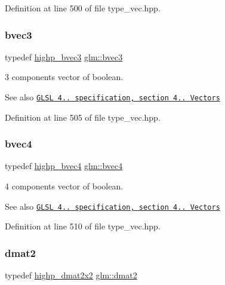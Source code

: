 Definition at line 500 of file type\+\_\+vec.\+hpp.

\mbox{\label{group__core__types_ga3f07d6d37fc6fe875170fd5799685bcf}} 
\subsubsection{\texorpdfstring{bvec3}{bvec3}}
{\footnotesize\ttfamily typedef \hyperlink{group__core__precision_ga1d77a773fdd024602413670788c10c62}{highp\+\_\+bvec3} \hyperlink{group__core__types_ga3f07d6d37fc6fe875170fd5799685bcf}{glm\+::bvec3}}

3 components vector of boolean.

\begin{DoxySeeAlso}{See also}
\href{http://www.opengl.org/registry/doc/GLSLangSpec.4.20.8.pdf}{\tt G\+L\+SL 4.. specification, section 4.. Vectors} 
\end{DoxySeeAlso}


Definition at line 505 of file type\+\_\+vec.\+hpp.

\mbox{\label{group__core__types_ga6bb211b3d3bebae3867548d5673ca5cd}} 
\subsubsection{\texorpdfstring{bvec4}{bvec4}}
{\footnotesize\ttfamily typedef \hyperlink{group__core__precision_ga381539af52c5e5c659700e12fb706eaf}{highp\+\_\+bvec4} \hyperlink{group__core__types_ga6bb211b3d3bebae3867548d5673ca5cd}{glm\+::bvec4}}

4 components vector of boolean.

\begin{DoxySeeAlso}{See also}
\href{http://www.opengl.org/registry/doc/GLSLangSpec.4.20.8.pdf}{\tt G\+L\+SL 4.. specification, section 4.. Vectors} 
\end{DoxySeeAlso}


Definition at line 510 of file type\+\_\+vec.\+hpp.

\mbox{\label{group__core__types_gad8c130d26c4cd9a1a831c1a74292a8f6}} 
\subsubsection{\texorpdfstring{dmat2}{dmat2}}
{\footnotesize\ttfamily typedef \hyperlink{group__core__precision_gaa5e35f6570d394c1cd34f411a473220c}{highp\+\_\+dmat2x2} \hyperlink{group__core__types_gad8c130d26c4cd9a1a831c1a74292a8f6}{glm\+::dmat2}}

